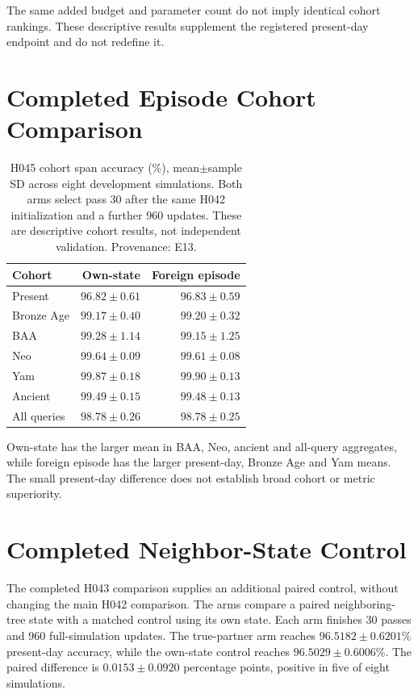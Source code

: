 \documentclass[letterpaper]{article}
\begin{document}
The same added budget and parameter count do not imply identical cohort rankings. These descriptive results supplement the registered present-day endpoint and do not redefine it.

\section{Completed Episode Cohort Comparison}
\begin{table}[t]
\centering
\small
\begin{tabular}{lrr}
\toprule
Cohort & Own-state & Foreign episode \\
\midrule
Present & $96.82\pm0.61$ & $96.83\pm0.59$ \\
Bronze Age & $99.17\pm0.40$ & $99.20\pm0.32$ \\
BAA & $99.28\pm1.14$ & $99.15\pm1.25$ \\
Neo & $99.64\pm0.09$ & $99.61\pm0.08$ \\
Yam & $99.87\pm0.18$ & $99.90\pm0.13$ \\
Ancient & $99.49\pm0.15$ & $99.48\pm0.13$ \\
All queries & $98.78\pm0.26$ & $98.78\pm0.25$ \\
\bottomrule
\end{tabular}
\caption{H045 cohort span accuracy (\%), mean$\pm$sample SD across eight development simulations. Both arms select pass 30 after the same H042 initialization and a further 960 updates. These are descriptive cohort results, not independent validation. Provenance: E13.}
\label{tab:episodecohorts}
\end{table}

Own-state has the larger mean in BAA, Neo, ancient and all-query aggregates, while foreign episode has the larger present-day, Bronze Age and Yam means. The small present-day difference does not establish broad cohort or metric superiority.

\section{Completed Neighbor-State Control}
The completed H043 comparison supplies an additional paired control, without changing the main H042 comparison. The arms compare a paired neighboring-tree state with a matched control using its own state. Each arm finishes 30 passes and 960 full-simulation updates. The true-partner arm reaches $96.5182\pm0.6201\%$ present-day accuracy, while the own-state control reaches $96.5029\pm0.6006\%$. The paired difference is $0.0153\pm0.0920$ percentage points, positive in five of eight simulations.
\end{document}
